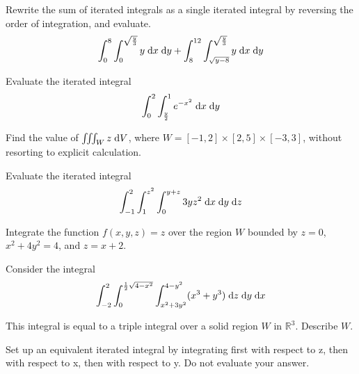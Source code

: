 \documentclass[boxes]{gsypset}
\begin{document}
	\begin{problem}[5.3.13]
		Rewrite the sum of iterated integrals as a single iterated integral by 
		reversing the order of integration, and evaluate.
		\[
			\int_0^8 \int_0^{\sqrt{\frac{y}{3}}} y \;\mathrm{d}x \;\mathrm{d}y +
			\int_8^{12} \int_{\sqrt{y-8}}^{\sqrt{\frac{y}{3}}} y \;\mathrm{d}x \;\mathrm{d}y
		\]
	\end{problem}
	\begin{solution}
		
	\end{solution}
	
	\begin{problem}[5.3.18]
		Evaluate the iterated integral
		\[
			\int_0^2 \int_{\frac{y}{2}}^1 e^{-x^2} \;\mathrm{d}x \;\mathrm{d}y
		\]
	\end{problem}
	\begin{solution}
		
	\end{solution}
	
	\begin{problem}[5.4.4]
		Find the value of $\iiint_W z \;\mathrm{d}V$, where $W = [-1,2]\times[2,5]\times[-3,3]$,
		without resorting to explicit calculation.
	\end{problem}
	\begin{solution}
		
	\end{solution}
	
	\begin{problem}[5.4.5]
		Evaluate the iterated integral
		\[
			\int_{-1}^2 \int_1^{z^2} \int_0^{y+z} 3yz^2 \;\mathrm{d}x \;\mathrm{d}y \;\mathrm{d}z
		\]
	\end{problem}
	\begin{solution}
		
	\end{solution}
	
	\begin{problem}[5.4.18]
		Integrate the function $f(x,y,z) = z$ over the region $W$ bounded by
		$z = 0$, $x^2 + 4y^2 = 4$, and $z = x + 2$.
	\end{problem}
	\begin{solution}
		
	\end{solution}
	
	\begin{problem}[5.4.29ab]
		Consider the integral
		\[
			\int _{-2} ^2
				\int _0 ^{\frac{1}{2} \sqrt{4 - x^2}}
					\int _{x^2 + 3y^2} ^{4 - y^2}
						(x^3+y^3)
					\;\mathrm{d}z
				\;\mathrm{d}y
			\;\mathrm{d}x
		\]
		\begin{subproblems}
			\subproblem
				This integral is equal to a triple integral over a solid region $W$ in $\mathbb{R}^3$.
				Describe $W$.
				\begin{solution}
					
				\end{solution}
			\subproblem
				Set up an equivalent iterated integral by integrating first with respect to z, 
				then with respect to x, then with respect to y. 
				Do not evaluate your answer.
				\begin{solution}
					
				\end{solution}
		\end{subproblems}
	\end{problem}
\end{document}
